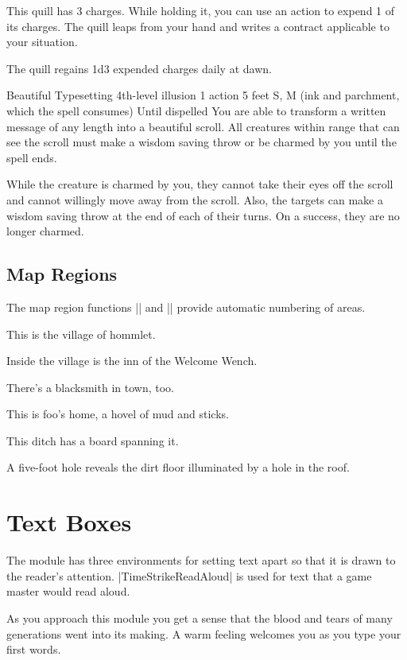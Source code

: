\documentclass[../main.tex]{subfiles}
\begin{document}
This quill has 3 charges. While holding it, you can use an action to expend 1 of its charges. The quill leaps from your hand and writes a contract applicable to your situation.

The quill regains 1d3 expended charges daily at dawn.

\TimeStrikeSpellHeader%
  {Beautiful Typesetting}
  {4th-level illusion}
  {1 action}
  {5 feet}
  {S, M (ink and parchment, which the spell consumes)}
  {Until dispelled}
You are able to transform a written message of any length into a beautiful scroll. All creatures within range that can see the scroll must make a wisdom saving throw or be charmed by you until the spell ends.

While the creature is charmed by you, they cannot take their eyes off the scroll and cannot willingly move away from the scroll. Also, the targets can make a wisdom saving throw at the end of each of their turns. On a success, they are no longer charmed.

\section{Map Regions}
The map region functions |\TimeStrikeArea| and |\TimeStrikeSubArea| provide automatic numbering of areas.

This is the village of hommlet.

Inside the village is the inn of the Welcome Wench.

There's a blacksmith in town, too.

This is foo's home, a hovel of mud and sticks.

This ditch has a board spanning it.

A five-foot hole reveals the dirt floor illuminated by a hole in the roof.

\chapter{Text Boxes}

The module has three environments for setting text apart so that it is drawn to the reader's attention. |TimeStrikeReadAloud| is used for text that a game master would read aloud.

\begin{TimeStrikeReadAloud}
  As you approach this module you get a sense that the blood and tears of many generations went into its making. A warm feeling welcomes you as you type your first words.
\end{TimeStrikeReadAloud}
\end{document}
